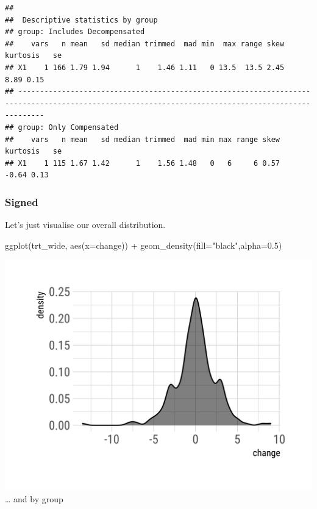\documentclass[
]{article}
\newenvironment{Shaded}{\begin{snugshade}}{\end{snugshade}}
\newcommand{\AttributeTok}[1]{\textcolor[rgb]{0.77,0.63,0.00}{#1}}
\newcommand{\FloatTok}[1]{\textcolor[rgb]{0.00,0.00,0.81}{#1}}
\newcommand{\FunctionTok}[1]{\textcolor[rgb]{0.00,0.00,0.00}{#1}}
\newcommand{\NormalTok}[1]{#1}
\newcommand{\SpecialCharTok}[1]{\textcolor[rgb]{0.00,0.00,0.00}{#1}}
\newcommand{\StringTok}[1]{\textcolor[rgb]{0.31,0.60,0.02}{#1}}
\begin{document}
\begin{Shaded}
\end{Shaded}

\begin{verbatim}
## 
##  Descriptive statistics by group 
## group: Includes Decompensated
##    vars   n mean   sd median trimmed  mad min  max range skew kurtosis   se
## X1    1 166 1.79 1.94      1    1.46 1.11   0 13.5  13.5 2.45     8.89 0.15
## -------------------------------------------------------------------------------------------------------------------------------------------------- 
## group: Only Compensated
##    vars   n mean   sd median trimmed  mad min max range skew kurtosis   se
## X1    1 115 1.67 1.42      1    1.56 1.48   0   6     6 0.57    -0.64 0.13
\end{verbatim}

\hypertarget{signed}{%
\subsubsection{Signed}\label{signed}}

Let's just visualise our overall distribution.

\begin{Shaded}
\begin{Highlighting}[]
\FunctionTok{ggplot}\NormalTok{(trt\_wide, }\FunctionTok{aes}\NormalTok{(}\AttributeTok{x=}\NormalTok{change)) }\SpecialCharTok{+}
  \FunctionTok{geom\_density}\NormalTok{(}\AttributeTok{fill=}\StringTok{"black"}\NormalTok{,}\AttributeTok{alpha=}\FloatTok{0.5}\NormalTok{)}
\end{Highlighting}
\end{Shaded}

\includegraphics{figures/unnamed-chunk-28-1.png} \ldots{} and by group
\end{document}
